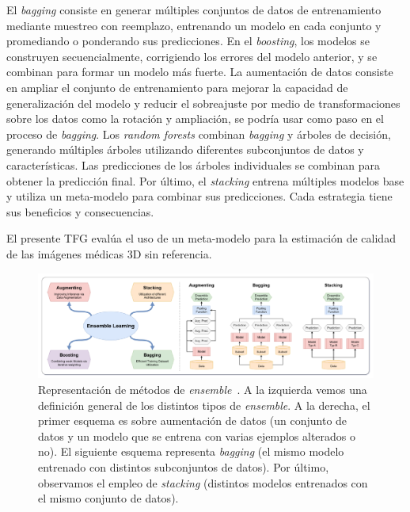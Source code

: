 El \emph{bagging} consiste en generar múltiples conjuntos de datos de entrenamiento 
mediante muestreo con reemplazo, entrenando un modelo en cada conjunto y 
promediando o ponderando sus predicciones. 
En el \emph{boosting}, los modelos se construyen secuencialmente, corrigiendo los errores 
del modelo anterior, y se combinan para formar un modelo más fuerte. 
La aumentación de datos consiste en ampliar el conjunto de entrenamiento para
mejorar la capacidad de generalización del modelo y reducir el sobreajuste por 
medio de transformaciones sobre los datos como la rotación y ampliación, 
se podría usar como paso en el proceso de \emph{bagging}.
Los \emph{random forests} combinan \emph{bagging} y árboles de decisión, 
generando múltiples árboles utilizando diferentes subconjuntos de datos y características. 
Las predicciones de los árboles individuales se combinan para obtener la predicción final.
Por último, el \emph{stacking} entrena múltiples modelos base y utiliza un meta-modelo 
para combinar sus predicciones. 
Cada estrategia tiene sus beneficios y consecuencias.

El presente TFG evalúa el uso de un meta-modelo para la estimación de calidad de 
las imágenes médicas 3D sin referencia.

\begin{figure}[htp]
  \centering
  \includegraphics[width=\textwidth]{imagenes/chapter2/EnsembleExample.png}
  \caption[Representación de métodos de \emph{ensemble}.]{Representación de métodos de \emph{ensemble}~\cite{MedicalEnsembleExample}.
    A la izquierda vemos una definición general de los distintos tipos de \emph{ensemble}. A la derecha, el primer esquema es sobre 
    aumentación de datos (un conjunto de datos y un modelo que se entrena con varias ejemplos alterados o no). El siguiente 
    esquema representa \emph{bagging} (el mismo modelo entrenado con distintos subconjuntos de datos). 
    Por último, observamos el empleo de \emph{stacking} (distintos modelos entrenados con el mismo conjunto de datos).
  }
  \label{fig:EnsembleExample}
\end{figure}


